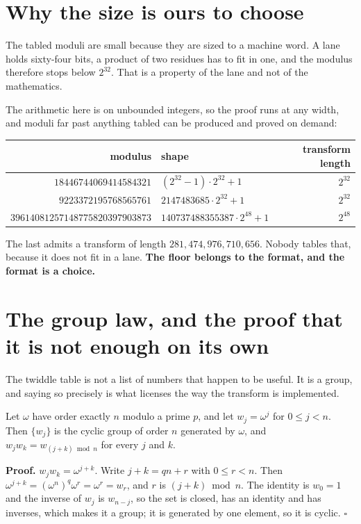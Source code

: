 \section{Why the size is ours to choose}

The tabled moduli are small because they are sized to a machine word. A lane holds sixty-four bits, a product of two residues has to fit in one, and the modulus therefore stops below \(2^{32}\). That is a property of the lane and not of the mathematics.

The arithmetic here is on unbounded integers, so the proof runs at any width, and moduli far past anything tabled can be produced and proved on demand:

\begin{center}
\begin{tabular}{@{}rlr@{}}
\toprule
modulus & shape & transform length \\
\midrule
\(18446744069414584321\) & \((2^{32}-1) \cdot 2^{32} + 1\) & \(2^{32}\) \\
\(9223372195768565761\) & \(2147483685 \cdot 2^{32} + 1\) & \(2^{32}\) \\
\(39614081257148775820397903873\) & \(140737488355387 \cdot 2^{48} + 1\) & \(2^{48}\) \\
\bottomrule
\end{tabular}
\end{center}

The last admits a transform of length \(281{,}474{,}976{,}710{,}656\). Nobody tables that, because it does not fit in a lane. \textbf{The floor belongs to the format, and the format is a choice.}

\section{The group law, and the proof that it is not enough on its own}

The twiddle table is not a list of numbers that happen to be useful. It is a group, and saying so precisely is what licenses the way the transform is implemented.

\begin{proposition}
Let \(\omega\) have order exactly \(n\) modulo a prime \(p\), and let \(w_j = \omega^j\) for \(0 \le j < n\). Then \(\{w_j\}\) is the cyclic group of order \(n\) generated by \(\omega\), and \(w_j w_k = w_{(j+k) \bmod n}\) for every \(j\) and \(k\).
\end{proposition}

\textbf{Proof.} \(w_j w_k = \omega^{j+k}\). Write \(j + k = qn + r\) with \(0 \le r < n\). Then \(\omega^{j+k} = (\omega^n)^q \omega^r = \omega^r = w_r\), and \(r\) is \((j+k) \bmod n\). The identity is \(w_0 = 1\) and the inverse of \(w_j\) is \(w_{n-j}\), so the set is closed, has an identity and has inverses, which makes it a group; it is generated by one element, so it is cyclic. \(\square\)

